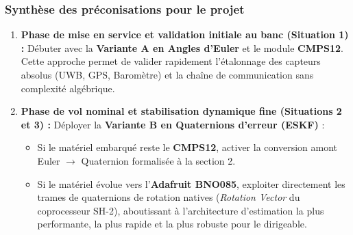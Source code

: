 \documentclass[../Formulations_Kalman.tex]{subfiles}
\begin{document}
\subsubsection{Synthèse des préconisations pour le projet}
\begin{enumerate}
    \item \textbf{Phase de mise en service et validation initiale au banc (Situation 1) :}
    Débuter avec la \textbf{Variante A en Angles d'Euler} et le module \textbf{CMPS12}. Cette approche permet de valider rapidement l'étalonnage des capteurs absolus (UWB, GPS, Baromètre) et la chaîne de communication sans complexité algébrique.
    \item \textbf{Phase de vol nominal et stabilisation dynamique fine (Situations 2 et 3) :}
    Déployer la \textbf{Variante B en Quaternions d'erreur (ESKF)} :
    \begin{itemize}
        \item Si le matériel embarqué reste le \textbf{CMPS12}, activer la conversion amont Euler $\to$ Quaternion formalisée à la section 2.
        \item Si le matériel évolue vers l'\textbf{Adafruit BNO085}, exploiter directement les trames de quaternions de rotation natives (\textit{Rotation Vector} du coprocesseur SH-2), aboutissant à l'architecture d'estimation la plus performante, la plus rapide et la plus robuste pour le dirigeable.
    \end{itemize}
\end{enumerate}
\end{document}
